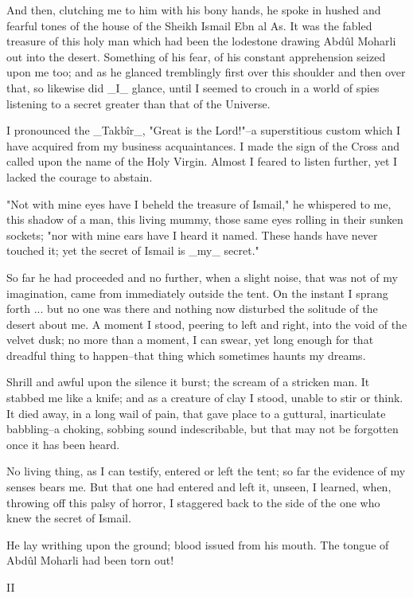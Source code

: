 And then, clutching me to him with his bony hands, he spoke in hushed
and fearful tones of the house of the Sheikh Ismail Ebn al As. It was
the fabled treasure of this holy man which had been the lodestone
drawing Abdûl Moharli out into the desert. Something of his fear, of
his constant apprehension seized upon me too; and as he glanced
tremblingly first over this shoulder and then over that, so likewise
did _I_ glance, until I seemed to crouch in a world of spies listening
to a secret greater than that of the Universe.

I pronounced the _Takbîr_, "Great is the Lord!"--a superstitious
custom which I have acquired from my business acquaintances. I made
the sign of the Cross and called upon the name of the Holy Virgin.
Almost I feared to listen further, yet I lacked the courage to
abstain.

"Not with mine eyes have I beheld the treasure of Ismail," he
whispered to me, this shadow of a man, this living mummy, those same
eyes rolling in their sunken sockets; "nor with mine ears have I
heard it named. These hands have never touched it; yet the secret of
Ismail is _my_ secret."

So far he had proceeded and no further, when a slight noise, that was
not of my imagination, came from immediately outside the tent. On the
instant I sprang forth ... but no one was there and nothing now
disturbed the solitude of the desert about me. A moment I stood,
peering to left and right, into the void of the velvet dusk; no more
than a moment, I can swear, yet long enough for that dreadful thing
to happen--that thing which sometimes haunts my dreams.

Shrill and awful upon the silence it burst; the scream of a stricken
man. It stabbed me like a knife; and as a creature of clay I stood,
unable to stir or think. It died away, in a long wail of pain, that
gave place to a guttural, inarticulate babbling--a choking, sobbing
sound indescribable, but that may not be forgotten once it has been
heard.

No living thing, as I can testify, entered or left the tent; so far
the evidence of my senses bears me. But that one had entered and left
it, unseen, I learned, when, throwing off this palsy of horror, I
staggered back to the side of the one who knew the secret of Ismail.

He lay writhing upon the ground; blood issued from his mouth. The
tongue of Abdûl Moharli had been torn out!


II

